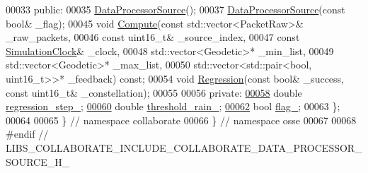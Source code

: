 \begin{DoxyCode}
00033  \textcolor{keyword}{public}:
00035   \hyperlink{classosse_1_1collaborate_1_1_data_processor_source_abda2d1b8e2939b332b1690ea1bbd2e21}{DataProcessorSource}();
00037   \hyperlink{classosse_1_1collaborate_1_1_data_processor_source_abda2d1b8e2939b332b1690ea1bbd2e21}{DataProcessorSource}(\textcolor{keyword}{const} \textcolor{keywordtype}{bool}& \_flag);
00045   \textcolor{keywordtype}{void} \hyperlink{classosse_1_1collaborate_1_1_data_processor_source_a625d453c95bf1491290afdd0b85d4681}{Compute}(\textcolor{keyword}{const} std::vector<PacketRaw>& \_raw\_packets,
00046                \textcolor{keyword}{const} uint16\_t& \_source\_index,
00047                \textcolor{keyword}{const} \hyperlink{classosse_1_1collaborate_1_1_simulation_clock}{SimulationClock}& \_clock,
00048                std::vector<Geodetic>* \_min\_list,
00049                std::vector<Geodetic>* \_max\_list,
00050                std::vector<std::pair<bool, uint16\_t>>* \_feedback) \textcolor{keyword}{const};
00054   \textcolor{keywordtype}{void} \hyperlink{classosse_1_1collaborate_1_1_data_processor_source_ae9b24ff12942f0c667064a349d12fa9b}{Regression}(\textcolor{keyword}{const} \textcolor{keywordtype}{bool}& \_success, \textcolor{keyword}{const} uint16\_t& \_constellation);
00055 
00056  \textcolor{keyword}{private}:
\hyperlink{classosse_1_1collaborate_1_1_data_processor_source_a676104998e0edb31c85f3ace7408ea30}{00058}   \textcolor{keywordtype}{double} \hyperlink{classosse_1_1collaborate_1_1_data_processor_source_a676104998e0edb31c85f3ace7408ea30}{regression\_step\_};
\hyperlink{classosse_1_1collaborate_1_1_data_processor_source_a987bff6789aae12fa88d317347304beb}{00060}   \textcolor{keywordtype}{double} \hyperlink{classosse_1_1collaborate_1_1_data_processor_source_a987bff6789aae12fa88d317347304beb}{threshold\_rain\_};
\hyperlink{classosse_1_1collaborate_1_1_data_processor_source_a9644f1ea065308146c05106d13dc2ccc}{00062}   \textcolor{keywordtype}{bool} \hyperlink{classosse_1_1collaborate_1_1_data_processor_source_a9644f1ea065308146c05106d13dc2ccc}{flag\_};
00063 \};
00064 
00065 \}  \textcolor{comment}{// namespace collaborate}
00066 \}  \textcolor{comment}{// namespace osse}
00067 
00068 \textcolor{preprocessor}{#endif  // LIBS\_COLLABORATE\_INCLUDE\_COLLABORATE\_DATA\_PROCESSOR\_SOURCE\_H\_}
\end{DoxyCode}

